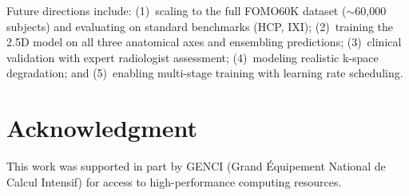 \documentclass[10pt,journal]{IEEEtran}
\begin{document}
Future directions include: (1)~scaling to the full FOMO60K dataset
($\sim$60{,}000 subjects) and evaluating on standard benchmarks (HCP,
IXI); (2)~training the 2.5D model on all three anatomical axes and
ensembling predictions; (3)~clinical validation with expert
radiologist assessment; (4)~modeling realistic k-space
degradation; and (5)~enabling multi-stage training with learning rate
scheduling.

\section*{Acknowledgment}

This work was supported in part by GENCI (Grand \'{E}quipement National
de Calcul Intensif) for access to high-performance computing resources.
\end{document}
